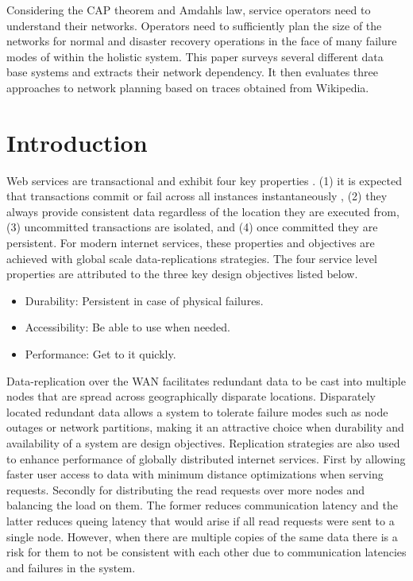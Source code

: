 \documentclass[conference]{IEEEtran}
\begin{document}
Considering the CAP theorem and Amdahls law, service operators need to understand their networks. Operators need to sufficiently plan the size of the networks for normal and disaster recovery operations in the face of many failure modes of within the holistic system. This paper surveys several different data base systems and extracts their network dependency. It then evaluates three approaches to network planning based on traces obtained from Wikipedia.


\section{Introduction}

Web services are transactional and exhibit four key properties \cite{CAP}. (1) it is expected that transactions commit or fail across all instances instantaneously , (2) they always provide consistent data regardless of the location they are executed from, (3) uncommitted transactions are isolated, and (4) once committed they are persistent. For modern internet services, these properties and objectives are achieved with global scale data-replications strategies. The four service level properties are attributed to the three key design objectives listed below. 

\begin{itemize}
	\item Durability: Persistent in case of physical failures.
	\item Accessibility: Be able to use when needed.
	\item Performance: Get to it quickly.
\end{itemize}

Data-replication over the WAN facilitates redundant data to be cast into multiple nodes that are spread across geographically disparate locations. Disparately located redundant data allows a system to tolerate failure modes such as node outages or network partitions, making it an attractive choice when durability and availability of a system are design objectives. Replication strategies are also used to enhance performance of globally distributed internet services. First by allowing faster user access to data with minimum distance optimizations when serving requests. Secondly for distributing the read requests over more nodes and balancing the load on them. The former reduces communication latency and the latter reduces queing latency that would arise if all read requests were sent to a single node. However, when there are multiple copies of the same data there is a risk for them to not be consistent with each other due to communication latencies and failures in the system.
\end{document}
